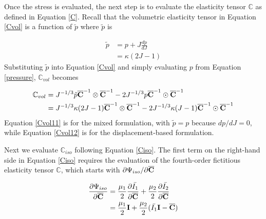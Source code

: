 Once the stress is evaluated, the next step is to evaluate the elasticity tensor $\mathbb{C}$ as defined in Equation \ref{C}. Recall that the volumetric elasticity tensor in Equation \ref{Cvol} is a function of $\tilde{p}$ where $\tilde{p}$ is

\begin{equation}
\begin{split}
\tilde{p} &= p + J\frac{dp}{dJ} \\
             &= \kappa{(2J - 1)}
\end{split}
\end{equation}
Substituting $\tilde{p}$ into Equation \ref{Cvol} and simply evaluating $p$ from Equation \ref{pressure}, $\mathbb{C}_{vol}$ becomes

\begin{subequations} \label{Cvol1}
\begin{align}
\mathbb{C}_{vol} &= J^{-1/3}\tilde{p}{\overline{\bold{C}}}^{-1}\otimes{\overline{\bold{C}}}^{-1} - 2J^{-1/3}p{\overline{\bold{C}}}^{-1}\odot{\overline{\bold{C}}}^{-1} \label{Cvol11} \\
&=  J^{-1/3}\kappa{(2J-1)} \overline{\bold{C}}^{-1} \otimes \overline{\bold{C}}^{-1} - 2J^{-1/3}\kappa{(J-1)} \overline{\bold{C}}^{-1} \odot \overline{\bold{C}}^{-1} \label{Cvol12}
\end{align}
\end{subequations} 
Equation \ref{Cvol11} is for the mixed formulation, with $\tilde{p} = p$ because $dp/dJ = 0$, while Equation \ref{Cvol12} is for the displacement-based formulation.

Next we evaluate $\mathbb{C}_{iso}$ following Equation \ref{Ciso}. The first term on the right-hand side in Equation \ref{Ciso} requires the evaluation of the fourth-order fictitious elasticity tensor $\mathbb{C}$, which starts with ${\partial{\Psi_{iso}}}/{\partial{\overline{\bold{C}}}}$

\begin{equation}
\begin{split}
\frac{\partial{\Psi_{iso}}}{\partial{\overline{\bold{C}}}} &= \frac{\mu_1}{2}\frac{\partial{\bar{I_1}}}{\partial{\overline{\bold{C}}}} +  \frac{\mu_2}{2}\frac{\partial{\bar{I_2}}}{\partial{\overline{\bold{C}}}} \\
&= \frac{\mu_1}{2}\bold{I} + \frac{\mu_2}{2}(\bar{I_1}\bold{I} - \overline{\bold{C}})
\end{split}
\end{equation}

